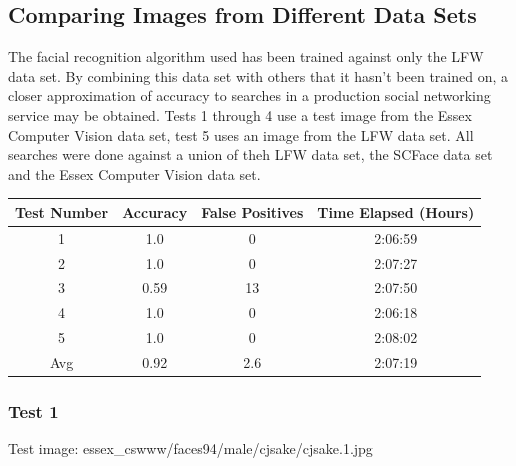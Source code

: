 \documentclass[12pt]{article}
\begin{document}
\subsection{Comparing Images from Different Data Sets}
The facial recognition algorithm used has been trained against only the LFW data set. By combining this data set with others that it hasn't been trained on, a closer approximation of accuracy to searches in a production social networking service may be obtained. Tests 1 through 4 use a test image from the Essex Computer Vision data set, test 5 uses an image from the LFW data set. All searches were done against a union of theh LFW data set, the SCFace data set and the Essex Computer Vision data set.

\begin{center}
\begin{tabular}{cccc}
Test Number & Accuracy & False Positives & Time Elapsed (Hours) \\
\hline
1 & 1.0 & 0 & 2:06:59\\
2 & 1.0 & 0 & 2:07:27\\
3 & 0.59 & 13 & 2:07:50\\
4 & 1.0 & 0 & 2:06:18\\
5 & 1.0 & 0 & 2:08:02\\
Avg & 0.92 & 2.6 & 2:07:19\\
\end{tabular}
\end{center}

\subsubsection{Test 1}
Test image: essex\_cswww/faces94/male/cjsake/cjsake.1.jpg
\end{document}
